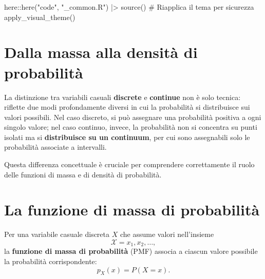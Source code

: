 \documentclass[
  italian,
  letterpaper,
  a4paper,
  11pt,
  open=any]{scrbook}
\newenvironment{Shaded}{\begin{snugshade}}{\end{snugshade}}
\newcommand{\CommentTok}[1]{\textcolor[rgb]{0.37,0.37,0.37}{#1}}
\newcommand{\FunctionTok}[1]{\textcolor[rgb]{0.28,0.35,0.67}{#1}}
\newcommand{\NormalTok}[1]{\textcolor[rgb]{0.00,0.23,0.31}{#1}}
\newcommand{\SpecialCharTok}[1]{\textcolor[rgb]{0.37,0.37,0.37}{#1}}
\newcommand{\StringTok}[1]{\textcolor[rgb]{0.13,0.47,0.30}{#1}}
\theoremstyle{plain}
\theoremstyle{definition}
\theoremstyle{definition}
\theoremstyle{remark}
\begin{document}
\begin{tcolorbox}[enhanced jigsaw, arc=.35mm, bottomrule=.15mm, bottomtitle=1mm, breakable, colback=white, colbacktitle=quarto-callout-caution-color!10!white, colframe=quarto-callout-caution-color-frame, coltitle=black, left=2mm, leftrule=.75mm, opacityback=0, opacitybacktitle=0.6, rightrule=.15mm, title=\textcolor{quarto-callout-caution-color}{\faFire}\hspace{0.5em}{Preparazione del Notebook}, titlerule=0mm, toprule=.15mm, toptitle=1mm]

\begin{Shaded}
\begin{Highlighting}[]
\NormalTok{here}\SpecialCharTok{::}\FunctionTok{here}\NormalTok{(}\StringTok{"code"}\NormalTok{, }\StringTok{"\_common.R"}\NormalTok{) }\SpecialCharTok{|\textgreater{}} 
  \FunctionTok{source}\NormalTok{()}
\CommentTok{\# Riapplica il tema per sicurezza}
\FunctionTok{apply\_visual\_theme}\NormalTok{()}
\end{Highlighting}
\end{Shaded}

\end{tcolorbox}

\section{Dalla massa alla densità di
probabilità}\label{dalla-massa-alla-densituxe0-di-probabilituxe0}

La distinzione tra variabili casuali \textbf{discrete} e
\textbf{continue} non è solo tecnica: riflette due modi profondamente
diversi in cui la probabilità si distribuisce sui valori possibili. Nel
caso discreto, si può assegnare una probabilità positiva a ogni singolo
valore; nel caso continuo, invece, la probabilità non si concentra su
punti isolati ma si \textbf{distribuisce su un continuum}, per cui sono
assegnabili solo le probabilità associate a intervalli.

Questa differenza concettuale è cruciale per comprendere correttamente
il ruolo delle funzioni di massa e di densità di probabilità.

\section{La funzione di massa di
probabilità}\label{la-funzione-di-massa-di-probabilituxe0}

Per una variabile casuale discreta \(X\) che assume valori nell'insieme
\[
\mathcal{X} = {x_1, x_2, \ldots},
\] la \textbf{funzione di massa di probabilità} (PMF) associa a ciascun
valore possibile la probabilità corrispondente: \[
p_X(x) = P(X = x).
\]
\end{document}
